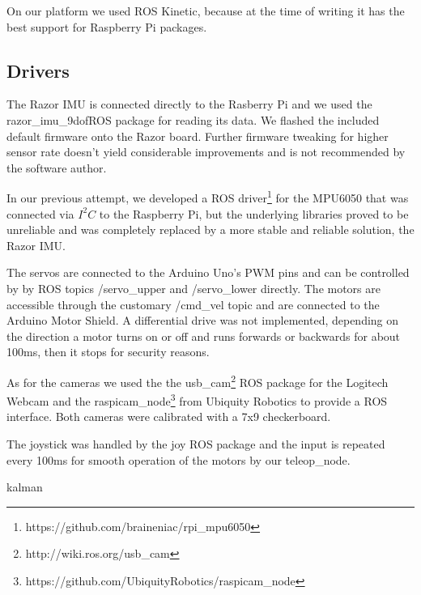 \documentclass[class=article, crop=false]{standalone}
\begin{document}
On our platform we used ROS Kinetic, because at the time of writing it has the best support for Raspberry Pi packages.

\subsection{Drivers}\label{subsec:drivers}
The Razor IMU is connected directly to the Rasberry Pi and we used the razor\_imu\_9dof\footnotemark ROS package for reading its data. We flashed the included default firmware onto the Razor board. Further firmware tweaking for higher sensor rate doesn't yield considerable improvements and is not recommended by the software author.


In our previous attempt, we developed a ROS driver\footnote{https://github.com/braineniac/rpi_mpu6050} for the MPU6050 that was connected via $ I^2C $ to the Raspberry Pi, but the underlying libraries proved to be unreliable and was completely replaced by a more stable and reliable solution, the Razor IMU.

The servos are connected to the Arduino Uno's PWM pins and can be controlled by by ROS topics /servo\_upper and /servo\_lower directly. The motors are accessible through the customary /cmd\_vel topic and are connected to the Arduino Motor Shield. A differential drive was not implemented, depending on the direction a motor turns on or off and runs forwards or backwards for about 100ms, then it stops for security reasons.

As for the cameras we used the the usb\_cam\footnote{http://wiki.ros.org/usb_cam} ROS package for the Logitech Webcam and the raspicam\_node\footnote{https://github.com/UbiquityRobotics/raspicam_node} from Ubiquity Robotics to provide a ROS interface. Both cameras were calibrated with a 7x9 checkerboard.

The joystick was handled by the joy ROS package and the input is repeated every 100ms for smooth operation of the motors by our teleop\_node.


{kalman}

\end{document}
